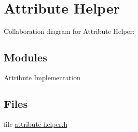 \hypertarget{group__attributehelper}{}\section{Attribute Helper}
\label{group__attributehelper}
Collaboration diagram for Attribute Helper\+:
\subsection*{Modules}
\begin{DoxyCompactItemize}
\item 
\hyperlink{group__attributeimpl}{Attribute Implementation}
\end{DoxyCompactItemize}
\subsection*{Files}
\begin{DoxyCompactItemize}
\item 
file \hyperlink{attribute-helper_8h}{attribute-\/helper.\+h}
\end{DoxyCompactItemize}
